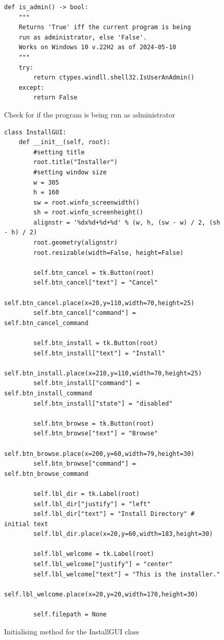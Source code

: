 \documentclass[11pt]{article}
\begin{document}
            \begin{figure}[!ht]
                \begin{verbatim}
def is_admin() -> bool:
    """
    Returns 'True' iff the current program is being 
    run as administrator, else 'False'. 
    Works on Windows 10 v.22H2 as of 2024-05-10
    """
    try:
        return ctypes.windll.shell32.IsUserAnAdmin()
    except:
        return False
                \end{verbatim}
                \caption{Check for if the program is being run as administrator}
                \label{sc:admin_checker}
            \end{figure}


            \begin{figure}[!ht]
                \begin{verbatim}
class InstallGUI:
    def __init__(self, root):
        #setting title
        root.title("Installer")
        #setting window size
        w = 305
        h = 160
        sw = root.winfo_screenwidth()
        sh = root.winfo_screenheight()
        alignstr = '%dx%d+%d+%d' % (w, h, (sw - w) / 2, (sh - h) / 2)
        root.geometry(alignstr)
        root.resizable(width=False, height=False)

        self.btn_cancel = tk.Button(root)
        self.btn_cancel["text"] = "Cancel"
        self.btn_cancel.place(x=20,y=110,width=70,height=25)
        self.btn_cancel["command"] = self.btn_cancel_command

        self.btn_install = tk.Button(root)
        self.btn_install["text"] = "Install"
        self.btn_install.place(x=210,y=110,width=70,height=25)
        self.btn_install["command"] = self.btn_install_command
        self.btn_install["state"] = "disabled"

        self.btn_browse = tk.Button(root)
        self.btn_browse["text"] = "Browse"
        self.btn_browse.place(x=200,y=60,width=79,height=30)
        self.btn_browse["command"] = self.btn_browse_command

        self.lbl_dir = tk.Label(root)
        self.lbl_dir["justify"] = "left"
        self.lbl_dir["text"] = "Install Directory" # initial text
        self.lbl_dir.place(x=20,y=60,width=183,height=30)

        self.lbl_welcome = tk.Label(root)
        self.lbl_welcome["justify"] = "center"
        self.lbl_welcome["text"] = "This is the installer."
        self.lbl_welcome.place(x=20,y=20,width=170,height=30)
        
        self.filepath = None
                \end{verbatim}
                \caption{Initialising method for the InstallGUI class}
                \label{sc:install_gui_init_sc_c1}
            \end{figure}
            
\end{document}

